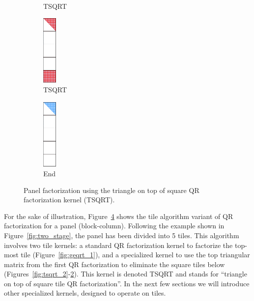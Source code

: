 \begin{figure}[h!]
\begin{subfigure}[t]{0.160 \textwidth}
      \caption{\label{fig:tsqrt_4}TSQRT}
    \end{subfigure}
    \hfill
    \begin{subfigure}[t]{0.160 \textwidth}
      \includegraphics[width=0.7cm, height=3.5cm]{fig/SVD_rect_panel_7}
      \caption{\label{fig:tsqrt_5}TSQRT}
    \end{subfigure}
    \hfill
    \begin{subfigure}[t]{0.160 \textwidth}
      \includegraphics[width=0.7cm, height=3.5cm]{fig/SVD_rect_panel_8}
      \caption{\label{fig:tsqrt_output}End}
    \end{subfigure}
    \caption{Panel factorization using the triangle on top of square QR factorization kernel (TSQRT).
    \label{fig:rect_panel}}
\end{figure}

For the sake of illustration, Figure~\ref{fig:rect_panel}
shows the tile algorithm variant of QR factorization for a panel
(block-column).
Following the example shown in
Figure~\ref{fig:two_stage}, the panel has been divided into 5 tiles.
This algorithm involves two tile kernels:
a standard QR factorization kernel to
factorize the top-most tile (Figure~\ref{fig:geqrt_1}),
and a specialized kernel to use the top triangular matrix
from the first QR factorization
to eliminate the square tiles below (Figures~\ref{fig:tsqrt_2}-\ref{fig:tsqrt_5}).
This kernel is denoted TSQRT and stands
for ``triangle on top of square tile QR factorization''.
In the next few sections we will introduce other specialized kernels,
designed to operate on tiles.
